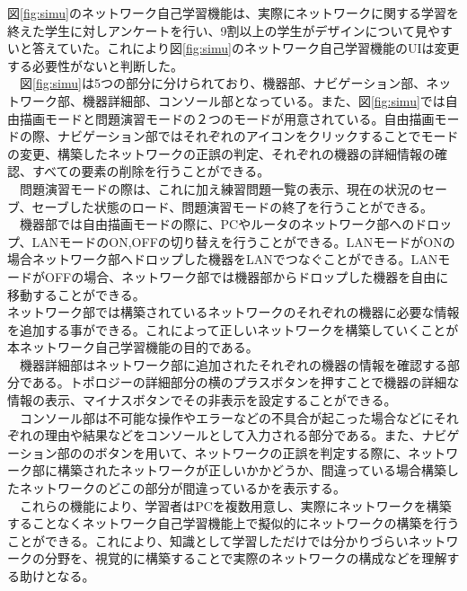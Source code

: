 図\ref{fig:simu}のネットワーク自己学習機能は、実際にネットワークに関する学習を終えた学生に対しアンケートを行い、9割以上の学生がデザインについて見やすいと答えていた。これにより図\ref{fig:simu}のネットワーク自己学習機能のUIは変更する必要性がないと判断した。\\
　図\ref{fig:simu}は5つの部分に分けられており、機器部、ナビゲーション部、ネットワーク部、機器詳細部、コンソール部となっている。また、図\ref{fig:simu}では自由描画モードと問題演習モードの２つのモードが用意されている。自由描画モードの際、ナビゲーション部ではそれぞれのアイコンをクリックすることでモードの変更、構築したネットワークの正誤の判定、それぞれの機器の詳細情報の確認、すべての要素の削除を行うことができる。\\
　問題演習モードの際は、これに加え練習問題一覧の表示、現在の状況のセーブ、セーブした状態のロード、問題演習モードの終了を行うことができる。\\
　機器部では自由描画モードの際に、PCやルータのネットワーク部へのドロップ、LANモードのON,OFFの切り替えを行うことができる。LANモードがONの場合ネットワーク部へドロップした機器をLANでつなぐことができる。LANモードがOFFの場合、ネットワーク部では機器部からドロップした機器を自由に移動することができる。\\
ネットワーク部では構築されているネットワークのそれぞれの機器に必要な情報を追加する事ができる。これによって正しいネットワークを構築していくことが本ネットワーク自己学習機能の目的である。\\
　機器詳細部はネットワーク部に追加されたそれぞれの機器の情報を確認する部分である。トポロジーの詳細部分の横のプラスボタンを押すことで機器の詳細な情報の表示、マイナスボタンでその非表示を設定することができる。\\
　コンソール部は不可能な操作やエラーなどの不具合が起こった場合などにそれぞれの理由や結果などをコンソールとして入力される部分である。また、ナビゲーション部ののボタンを用いて、ネットワークの正誤を判定する際に、ネットワーク部に構築されたネットワークが正しいかかどうか、間違っている場合構築したネットワークのどこの部分が間違っているかを表示する。\\
　これらの機能により、学習者はPCを複数用意し、実際にネットワークを構築することなくネットワーク自己学習機能上で擬似的にネットワークの構築を行うことができる。これにより、知識として学習しただけでは分かりづらいネットワークの分野を、視覚的に構築することで実際のネットワークの構成などを理解する助けとなる。
